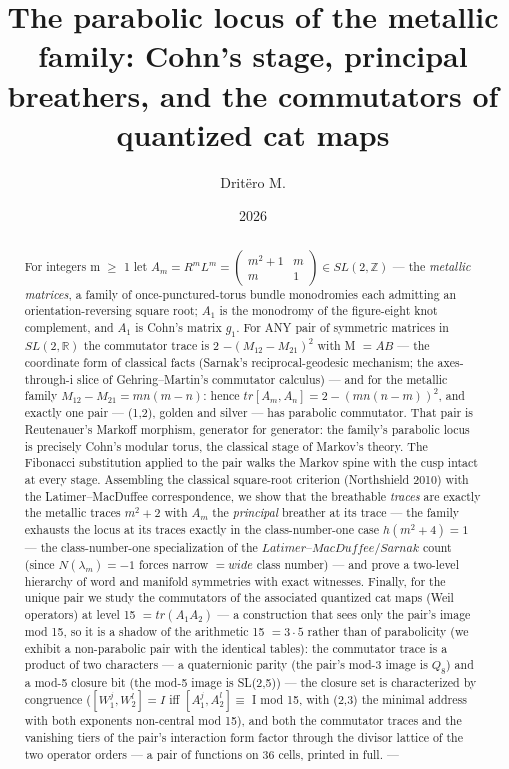 \documentclass[11pt]{article}
\title{The parabolic locus of the metallic family: Cohn's stage, principal breathers, and the commutators of quantized cat maps}
\author{Dritëro M.}
\date{2026}
\theoremstyle{plain}
\theoremstyle{definition}
\theoremstyle{remark}
\begin{document}
\maketitle
\begin{abstract}
For integers m \(\ge \) 1 let \(A_{m} = R^{m} L^{m} = \left(\begin{smallmatrix}m^{2}+1 & m\\m & 1\end{smallmatrix}\right) \in  SL(2,\mathbb{Z})\) — the \emph{metallic matrices}, a family of once-punctured-torus bundle monodromies each admitting an orientation-reversing square root; \(A_{1}\) is the monodromy of the figure-eight knot complement, and \(A_{1}\) is Cohn's matrix \(g_{1}\). For ANY pair of symmetric matrices in \(SL(2,\mathbb{R})\) the commutator trace is 2 \(- (M_{12} - M_{21})^{2}\) with M \(= AB\) — the coordinate form of classical facts (Sarnak's reciprocal-geodesic mechanism; the axes- through-i slice of Gehring–Martin's commutator calculus) — and for the metallic family \(M_{12} - M_{21} = mn(m-n)\): hence \(tr[A_{m}, A_{n}] = 2 - (mn(n-m))^{2}\), and exactly one pair — (1,2), golden and silver — has parabolic commutator. That pair is Reutenauer's Markoff morphism, generator for generator: the family's parabolic locus is precisely Cohn's modular torus, the classical stage of Markov's theory. The Fibonacci substitution applied to the pair walks the Markov spine with the cusp intact at every stage. Assembling the classical square-root criterion (Northshield 2010) with the Latimer–MacDuffee correspondence, we show that the breathable \emph{traces} are exactly the metallic traces \(m^{2} + 2\) with \(A_{m}\) the \emph{principal} breather at its trace — the family exhausts the locus at its traces exactly in the class-number-one case \(h(m^{2}+4) = 1\) — the class-number-one specialization of the \(Latimer–MacDuffee/Sarnak\) count (since \(N(\lambda _{m}) = -1\) forces narrow \(= wide\) class number) — and prove a two-level hierarchy of word and manifold symmetries with exact witnesses. Finally, for the unique pair we study the commutators of the associated quantized cat maps (Weil operators) at level 15 \(= tr(A_{1}A_{2})\) — a construction that sees only the pair's image mod 15, so it is a shadow of the arithmetic 15 \(= 3\cdot 5\) rather than of parabolicity (we exhibit a non-parabolic pair with the identical tables): the commutator trace is a product of two characters — a quaternionic parity (the pair's mod-3 image is \(Q_{8}\)) and a mod-5 closure bit (the mod-5 image is SL(2,5)) — the closure set is characterized by congruence (\([W_{1}^{j}, W_{2}^{l}] = I\) iff \([A_{1}^{j}, A_{2}^{l}] \equiv \) I mod 15, with (2,3) the minimal address with both exponents non-central mod 15), and both the commutator traces and the vanishing tiers of the pair's interaction form factor through the divisor lattice of the two operator orders — a pair of functions on 36 cells, printed in full.  ---
\end{abstract}
\end{document}
